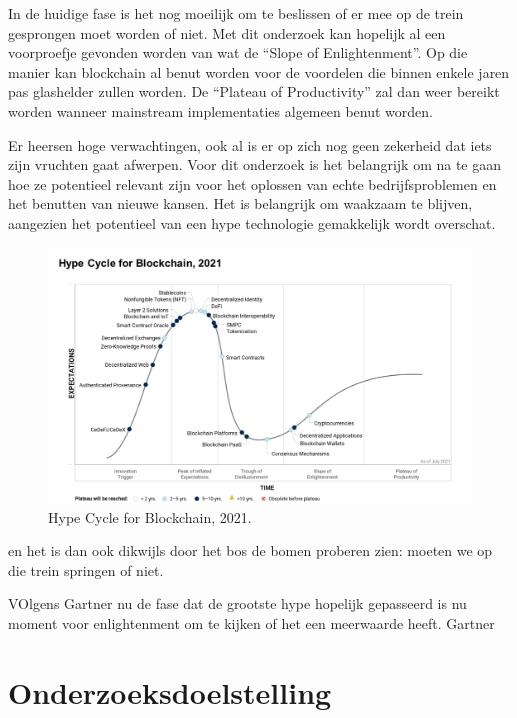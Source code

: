 In de huidige fase is het nog moeilijk om te beslissen of er mee op de trein gesprongen moet worden of niet. Met dit onderzoek kan hopelijk al een voorproefje gevonden worden van wat de ``Slope of Enlightenment''. Op die manier kan blockchain al benut worden voor de voordelen die binnen enkele jaren pas glashelder zullen worden. De ``Plateau of Productivity'' zal dan weer bereikt worden wanneer mainstream implementaties algemeen benut worden.





Er heersen hoge verwachtingen, ook al is er op zich nog geen zekerheid dat iets zijn vruchten gaat afwerpen. Voor dit onderzoek is het belangrijk om na te gaan hoe ze potentieel relevant zijn voor het oplossen van echte bedrijfsproblemen en het benutten van nieuwe kansen.
Het is belangrijk om waakzaam te blijven, aangezien het potentieel van een hype technologie gemakkelijk wordt overschat.





\begin{figure}
	\includegraphics[width=\textwidth]{img/inleiding/Gartner_Hype_Cycle_for_Blockchain_2021.png}
	\caption{\label{fig:gartner}Hype Cycle for Blockchain, 2021.}
\end{figure}


en het is dan ook dikwijls door het bos de bomen proberen zien: moeten we op die trein springen of niet.


VOlgens Gartner nu de fase dat de grootste hype hopelijk gepasseerd is
nu moment voor enlightenment om te kijken of het een meerwaarde heeft.
Gartner


\section{Onderzoeksdoelstelling}
\label{sec:onderzoeksdoelstelling}


